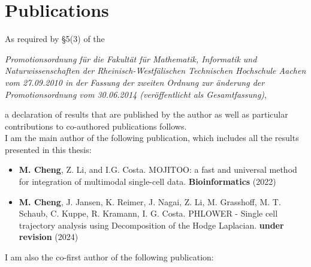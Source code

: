 \chapter*{Publications}
As required by \S 5(3) of the \\

\begin{addmargin}{0.05\textwidth}
\textit{Promotionsordnung f\"ur die Fakult\"at f\"ur Mathematik, Informatik und Naturwissenschaften der Rheinisch-Westf\"alischen Technischen Hochschule Aachen vom 27.09.2010 in der \linebreak Fassung der zweiten Ordnung zur \"anderung der Promotionsordnung vom 30.06.2014 \linebreak (ver\"offentlicht als Gesamtfassung)},
\end{addmargin} 
\vspace{0.5cm}

\noindent
a declaration of results that are published by the author as well as particular contributions to co-authored publications follows. \\


I am the main author of the following publication, which includes all the results presented in this
thesis:

\begin{addmargin}{0.02\textwidth}
	\begin{itemize}
	\item \textbf{M. Cheng}, Z. Li, and I.G. Costa. MOJITOO: a fast and universal method for integration of multimodal single-cell data. \textbf{Bioinformatics} (2022) \\
	\end{itemize}
\end{addmargin}


\begin{addmargin}{0.02\textwidth}
	\begin{itemize}
	\item \textbf{M. Cheng}, J. Jansen, K. Reimer, J. Nagai, Z. Li, M. Grasshoff, M. T. Schaub, C. Kuppe, R. Kramann,  I. G. Costa. PHLOWER - Single cell trajectory analysis using Decomposition of the Hodge Laplacian. \textbf{under revision} (2024)\\

	\end{itemize}
\end{addmargin}


I am also the co-first author of the following publication:\\


